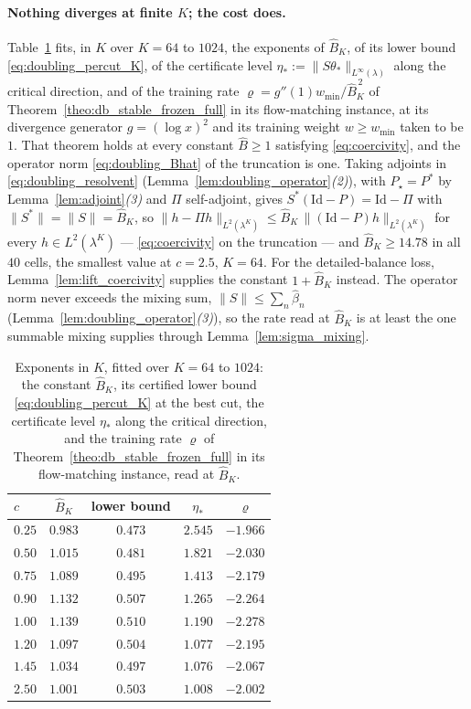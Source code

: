 \paragraph{Nothing diverges at finite $K$; the cost does.}
Table~\ref{tab:doubling_cost} fits, in $K$ over $K=64$ to $1024$, the exponents of
$\widehat B_K$, of its lower bound \eqref{eq:doubling_percut_K}, of the certificate level
$\eta_*:=\|S\theta_*\|_{L^\infty(\lambda)}$ along the critical direction, and of the training
rate $\varrho=g''(1)w_{\min}/\widehat B_K^{\,2}$ of
Theorem~\ref{theo:db_stable_frozen_full} in its flow-matching instance, at its divergence
generator $g=(\log x)^2$ and its training weight $w\geq w_{\min}$ taken to be $1$. That
theorem holds at every constant $\widehat B\geq1$ satisfying \eqref{eq:coercivity}, and the
operator norm \eqref{eq:doubling_Bhat} of the truncation is one. Taking adjoints in
\eqref{eq:doubling_resolvent} (Lemma~\ref{lem:doubling_operator}\emph{(2)}), with
$P_\star=P^*$ by Lemma~\ref{lem:adjoint}\emph{(3)} and $\Pi$ self-adjoint, gives
$S^*(\mathrm{Id}-P)=\mathrm{Id}-\Pi$ with $\|S^*\|=\|S\|=\widehat B_K$, so
$\|h-\Pi h\|_{L^2(\lambda^K)}\leq\widehat B_K\,\|(\mathrm{Id}-P)h\|_{L^2(\lambda^K)}$ for every
$h\in L^2(\lambda^K)$ --- \eqref{eq:coercivity} on the truncation --- and $\widehat B_K\geq14.78$
in all $40$ cells, the smallest value at $c=2.5$, $K=64$. For the detailed-balance loss,
Lemma~\ref{lem:lift_coercivity} supplies the constant $1+\widehat B_K$ instead. The operator
norm never exceeds the mixing sum, $\|S\|\leq\sum_n\widehat\beta_n$
(Lemma~\ref{lem:doubling_operator}\emph{(3)}), so the rate read at $\widehat B_K$ is at least
the one summable mixing supplies through Lemma~\ref{lem:sigma_mixing}.

\begin{table}[tb]
\centering
\small
\begin{tabular}{@{}lcccc@{}}
\hline
$c$ & $\widehat B_K$ & lower bound & $\eta_*$ & $\varrho$ \\
\hline
$0.25$ & $0.983$ & $0.473$ & $2.545$ & $-1.966$ \\
$0.50$ & $1.015$ & $0.481$ & $1.821$ & $-2.030$ \\
$0.75$ & $1.089$ & $0.495$ & $1.413$ & $-2.179$ \\
$0.90$ & $1.132$ & $0.507$ & $1.265$ & $-2.264$ \\
$1.00$ & $1.139$ & $0.510$ & $1.190$ & $-2.278$ \\
$1.20$ & $1.097$ & $0.504$ & $1.077$ & $-2.195$ \\
$1.45$ & $1.034$ & $0.497$ & $1.076$ & $-2.067$ \\
$2.50$ & $1.001$ & $0.503$ & $1.008$ & $-2.002$ \\
\hline
\end{tabular}
\caption{Exponents in $K$, fitted over $K=64$ to $1024$: the constant $\widehat B_K$, its
certified lower bound \eqref{eq:doubling_percut_K} at the best cut, the certificate level
$\eta_*$ along the critical direction, and the training rate $\varrho$ of
Theorem~\ref{theo:db_stable_frozen_full} in its flow-matching instance, read at $\widehat B_K$.}
\label{tab:doubling_cost}
\end{table}

